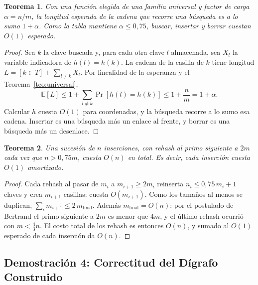 \documentclass[11pt,a4paper]{article}
\newtheorem{teorema}{Teorema}
\theoremstyle{definition}
\begin{document}
\begin{teorema}\label{teo:esperado}
Con una función elegida de una familia universal y factor de carga $\alpha=n/m$, la longitud esperada de la cadena que recorre una búsqueda es a lo sumo $1+\alpha$. Como la tabla mantiene $\alpha\le0{,}75$, buscar, insertar y borrar cuestan $O(1)$ esperado.
\end{teorema}
\begin{proof}
Sea $k$ la clave buscada y, para cada otra clave $l$ almacenada, sea $X_{l}$ la variable indicadora de $h(l)=h(k)$. La cadena de la casilla de $k$ tiene longitud $L=[k\in T]+\sum_{l\neq k}X_{l}$. Por linealidad de la esperanza y el Teorema~\ref{teo:universal},
\[ \mathbb{E}[L]\le 1+\sum_{l\neq k}\Pr[h(l)=h(k)]\le 1+\frac{n}{m}=1+\alpha. \]
Calcular $h$ cuesta $O(1)$ para coordenadas, y la búsqueda recorre a lo sumo esa cadena. Insertar es una búsqueda más un enlace al frente, y borrar es una búsqueda más un desenlace.
\end{proof}

\begin{teorema}\label{teo:amortizado}
Una sucesión de $n$ inserciones, con rehash al primo siguiente a $2m$ cada vez que $n>0{,}75m$, cuesta $O(n)$ en total. Es decir, cada inserción cuesta $O(1)$ amortizado.
\end{teorema}
\begin{proof}
Cada rehash al pasar de $m_i$ a $m_{i+1}\ge2m_i$ reinserta $n_i\le0{,}75\,m_i+1$ claves y crea $m_{i+1}$ casillas: cuesta $O(m_{i+1})$. Como los tamaños al menos se duplican, $\sum_i m_{i+1}\le 2\,m_{\text{final}}$. Además $m_{\text{final}}=O(n)$: por el postulado de Bertrand el primo siguiente a $2m$ es menor que $4m$, y el último rehash ocurrió con $m<\tfrac{4}{3}n$. El costo total de los rehash es entonces $O(n)$, y sumado al $O(1)$ esperado de cada inserción da $O(n)$.
\end{proof}

\subsection{Demostración 4: Correctitud del Dígrafo Construido}
\end{document}
